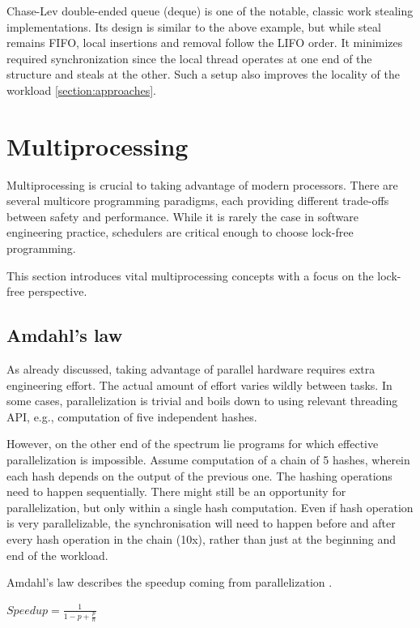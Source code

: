 \documentclass[12pt,a4paper,twoside]{report}
\begin{document}
\label{paragraph:deque}
Chase-Lev double-ended queue (deque) is one of the notable, classic work stealing implementations. Its design is similar to the above example, but while steal remains FIFO, local insertions and removal follow the LIFO order. It minimizes required synchronization since the local thread operates at one end of the structure and steals at the other. Such a setup also improves the locality of the workload \ref{section:approaches}. 

\section{Multiprocessing}
\label{section:background_multiprocessing}

Multiprocessing is crucial to taking advantage of modern processors. There are several multicore programming paradigms, each providing different trade-offs between safety and performance. While it is rarely the case in software engineering practice, schedulers are critical enough to choose lock-free programming. 

This section introduces vital multiprocessing concepts with a focus on the lock-free perspective.  

\subsection{Amdahl's law}
As already discussed, taking advantage of parallel hardware requires extra engineering effort. The actual amount of effort varies wildly between tasks. In some cases, parallelization is trivial and boils down to using relevant threading API, e.g., computation of five independent hashes. 

However, on the other end of the spectrum lie programs for which effective parallelization is impossible. Assume computation of a chain of 5 hashes, wherein each hash depends on the output of the previous one. The hashing operations need to happen sequentially. There might still be an opportunity for parallelization, but only within a single hash computation. Even if hash operation is very parallelizable, the synchronisation will need to happen before and after every hash operation in the chain (10x), rather than just at the beginning and end of the workload. 

Amdahl's law describes the speedup coming from parallelization \cite{art_of_mult}.

\begin{center}
$Speedup = \frac{1}{1 - p + \frac{p}{n}}$
\end{center} 
\end{document}
